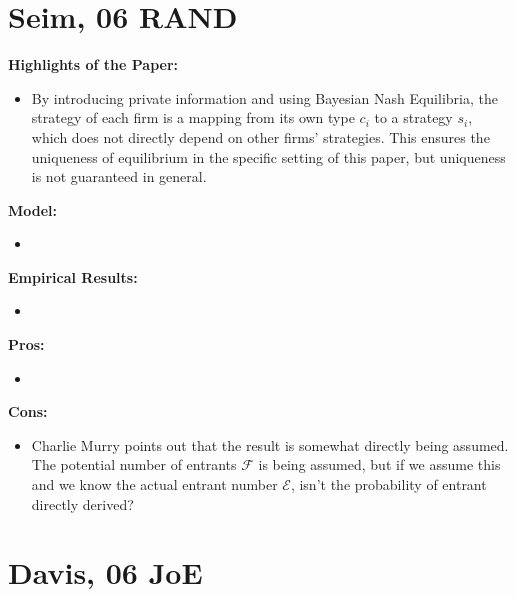 \documentclass{book}
\theoremstyle{plain}
\theoremstyle{definition}
\begin{document}

\section{Seim, 06 RAND} %
\label{sec:seim_06_rand}

\textbf{}

\vspace{1em}
\noindent
\textbf{Highlights of the Paper:}
\begin{itemize}
	\item By introducing private information and using Bayesian Nash Equilibria, the strategy of each firm is a mapping from its own type $c_i$ to a strategy $s_i$, which does not directly depend on other firms' strategies. 
	This ensures the uniqueness of equilibrium in the specific setting of this paper, but uniqueness is not guaranteed in general.
\end{itemize}

\vspace{1em}
\noindent
\textbf{Model:}
\begin{itemize}
	\item 
\end{itemize}

\vspace{1em}
\noindent
\textbf{Empirical Results:}
\begin{itemize}
	\item 
\end{itemize}

\vspace{1em}
\noindent
\textbf{Pros:}
\begin{itemize}
	\item 
\end{itemize}

\vspace{1em}
\noindent
\textbf{Cons:}
\begin{itemize}
	\item Charlie Murry points out that the result is somewhat directly being assumed. The potential number of entrants $\mathcal F$ is being assumed, but if we assume this and we know the actual entrant number $\mathcal E$, isn't the probability of entrant directly derived?
\end{itemize}


\section{Davis, 06 JoE} %
\label{sec:davis_06_joe}
\end{document}
